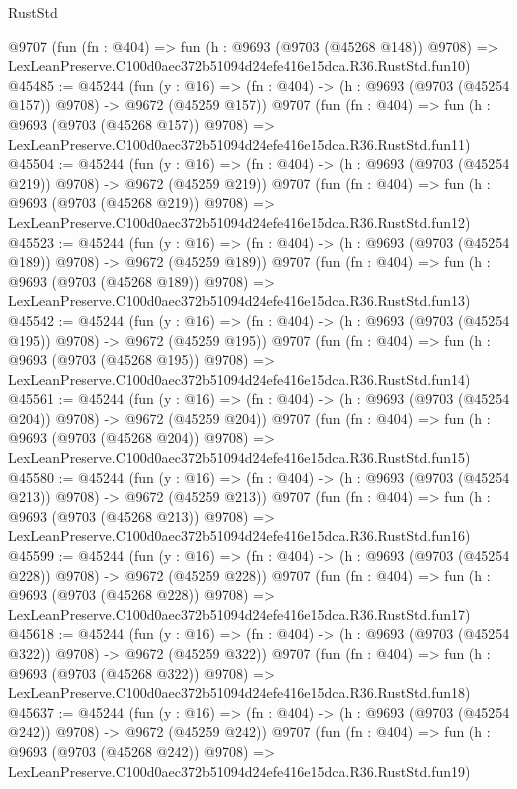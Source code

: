 \begin{lexlean}{RustStd}
\begin{coremodule}
    @9707
    (fun (fn : @404) =>
    fun (h : @9693 (@9703 (@45268 @148)) @9708) =>
    LexLeanPreserve.C100d0aec372b51094d24efe416e15dca.R36.RustStd.fun10)
@45485 := @45244
    (fun (y : @16) => (fn : @404) -> (h : @9693 (@9703 (@45254 @157)) @9708) -> @9672 (@45259 @157))
    @9707
    (fun (fn : @404) =>
    fun (h : @9693 (@9703 (@45268 @157)) @9708) =>
    LexLeanPreserve.C100d0aec372b51094d24efe416e15dca.R36.RustStd.fun11)
@45504 := @45244
    (fun (y : @16) => (fn : @404) -> (h : @9693 (@9703 (@45254 @219)) @9708) -> @9672 (@45259 @219))
    @9707
    (fun (fn : @404) =>
    fun (h : @9693 (@9703 (@45268 @219)) @9708) =>
    LexLeanPreserve.C100d0aec372b51094d24efe416e15dca.R36.RustStd.fun12)
@45523 := @45244
    (fun (y : @16) => (fn : @404) -> (h : @9693 (@9703 (@45254 @189)) @9708) -> @9672 (@45259 @189))
    @9707
    (fun (fn : @404) =>
    fun (h : @9693 (@9703 (@45268 @189)) @9708) =>
    LexLeanPreserve.C100d0aec372b51094d24efe416e15dca.R36.RustStd.fun13)
@45542 := @45244
    (fun (y : @16) => (fn : @404) -> (h : @9693 (@9703 (@45254 @195)) @9708) -> @9672 (@45259 @195))
    @9707
    (fun (fn : @404) =>
    fun (h : @9693 (@9703 (@45268 @195)) @9708) =>
    LexLeanPreserve.C100d0aec372b51094d24efe416e15dca.R36.RustStd.fun14)
@45561 := @45244
    (fun (y : @16) => (fn : @404) -> (h : @9693 (@9703 (@45254 @204)) @9708) -> @9672 (@45259 @204))
    @9707
    (fun (fn : @404) =>
    fun (h : @9693 (@9703 (@45268 @204)) @9708) =>
    LexLeanPreserve.C100d0aec372b51094d24efe416e15dca.R36.RustStd.fun15)
@45580 := @45244
    (fun (y : @16) => (fn : @404) -> (h : @9693 (@9703 (@45254 @213)) @9708) -> @9672 (@45259 @213))
    @9707
    (fun (fn : @404) =>
    fun (h : @9693 (@9703 (@45268 @213)) @9708) =>
    LexLeanPreserve.C100d0aec372b51094d24efe416e15dca.R36.RustStd.fun16)
@45599 := @45244
    (fun (y : @16) => (fn : @404) -> (h : @9693 (@9703 (@45254 @228)) @9708) -> @9672 (@45259 @228))
    @9707
    (fun (fn : @404) =>
    fun (h : @9693 (@9703 (@45268 @228)) @9708) =>
    LexLeanPreserve.C100d0aec372b51094d24efe416e15dca.R36.RustStd.fun17)
@45618 := @45244
    (fun (y : @16) => (fn : @404) -> (h : @9693 (@9703 (@45254 @322)) @9708) -> @9672 (@45259 @322))
    @9707
    (fun (fn : @404) =>
    fun (h : @9693 (@9703 (@45268 @322)) @9708) =>
    LexLeanPreserve.C100d0aec372b51094d24efe416e15dca.R36.RustStd.fun18)
@45637 := @45244
    (fun (y : @16) => (fn : @404) -> (h : @9693 (@9703 (@45254 @242)) @9708) -> @9672 (@45259 @242))
    @9707
    (fun (fn : @404) =>
    fun (h : @9693 (@9703 (@45268 @242)) @9708) =>
    LexLeanPreserve.C100d0aec372b51094d24efe416e15dca.R36.RustStd.fun19)

\end{coremodule}
\end{lexlean}
